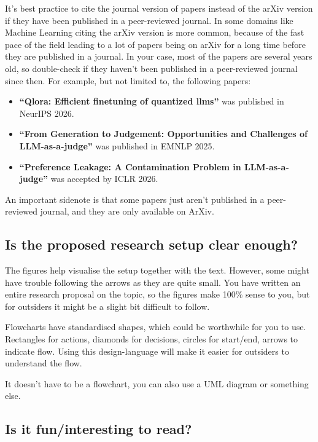 \documentclass{article}
\begin{document}
It's best practice to cite the journal version of papers instead of the arXiv version if they have been published in a peer-reviewed journal. In some domains like Machine Learning citing the arXiv version is more common, because of the fast pace of the field leading to a lot of papers being on arXiv for a long time before they are published in a journal. In your case, most of the papers are several years old, so double-check if they haven't been published in a peer-reviewed journal since then. For example, but not limited to, the following papers:

\begin{itemize}
	\item \textbf{``Qlora: Efficient finetuning of quantized llms''} was published in NeurIPS 2026.
	\item \textbf{``From Generation to Judgement: Opportunities and Challenges of LLM-as-a-judge''} was published in EMNLP 2025.
	\item \textbf{``Preference Leakage: A Contamination Problem in LLM-as-a-judge''} was accepted by ICLR 2026.
\end{itemize}

An important sidenote is that some papers just aren't published in a peer-reviewed journal, and they are only available on ArXiv.


\subsection{Is the proposed research setup clear enough?}

The figures help visualise the setup together with the text. However, some might have trouble following the arrows as they are quite small. You have written an entire research proposal on the topic, so the figures make 100\% sense to you, but for outsiders it might be a slight bit difficult to follow.

Flowcharts have standardised shapes, which could be worthwhile for you to use. Rectangles for actions, diamonds for decisions, circles for start/end, arrows to indicate flow. Using this design-language will make it easier for outsiders to understand the flow.

It doesn't have to be a flowchart, you can also use a UML diagram or something else.



\subsection{Is it fun/interesting to read?}
\end{document}
